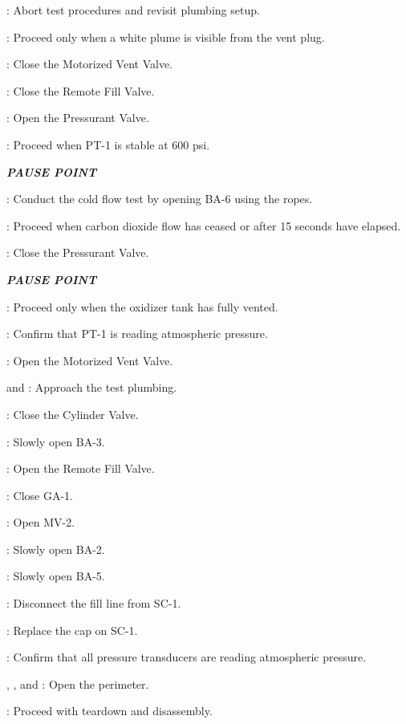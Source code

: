 \begin{checklist}
\begin{checklist}[label=$\bullet$]
\begin{checklist}
            \item \ops{}: Abort test procedures and revisit plumbing setup.
        \end{checklist}
    \end{checklist}
    \item \ops{}: Proceed only when a white plume is visible from the vent plug.
    \item \control{}: Close the Motorized Vent Valve.
    \item \control{}: Close the Remote Fill Valve.
    \item \control{}: Open the Pressurant Valve.
    \item \daq{}: Proceed when PT-1 is stable at 600 psi.
    \item \textbf{\textit{PAUSE POINT}}
    \item \primary{}: Conduct the cold flow test by opening BA-6 using the ropes.
    \item \ops{}: Proceed when carbon dioxide flow has ceased or after 15 seconds have elapsed.
    \item \control{}: Close the Pressurant Valve.
    \item \textbf{\textit{PAUSE POINT}}
    \item \ops{}: Proceed only when the oxidizer tank has fully vented.
    \item \daq{}: Confirm that PT-1 is reading atmospheric pressure.
    \item \control{}: Open the Motorized Vent Valve.
    \item \primary{} and \secondary{}: Approach the test plumbing.
    \item \primary{}: Close the Cylinder Valve.
    \item \primary{}: Slowly open BA-3.
    \item \control{}: Open the Remote Fill Valve.
    \item \primary{}: Close GA-1.
    \item \control{}: Open MV-2.
    \item \primary{}: Slowly open BA-2.
    \item \primary{}: Slowly open BA-5.
    \item \primary{}: Disconnect the fill line from SC-1.
    \item \primary{}: Replace the cap on SC-1.
    \item \daq{}: Confirm that all pressure transducers are reading atmospheric pressure.
    \item \peri{}, \perii{}, and \periii{}: Open the perimeter.
    \item \ops{}: Proceed with teardown and disassembly.
\end{checklist}

